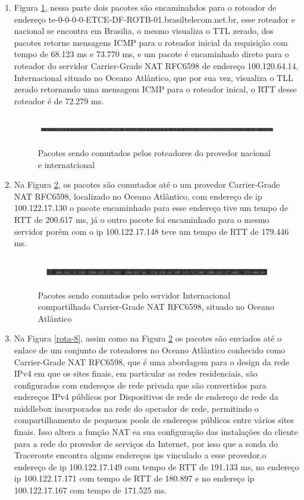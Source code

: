 \documentclass[
	article,			%
	11pt,				%
	oneside,			%
	a4paper,			%
	section=TITLE,		%
	english,			%
	brazil,				%
	sumario=tradicional
	]{abntex2}
\begin{document}
\begin{enumerate}
		\item 
		Figura \ref{rota-6}, nessa parte dois pacotes são encaminahdos para o roteador de endereço te-0-0-0-0-ETCE-DF-ROTB-01.brasiltelecom.net.br, esse roteador e nacional se encontra em Brasilia, o mesmo visualiza o TTL zerado, dos pacotes retorne mensagens ICMP para o roteador inicial da requisição com tempo de 68.123 ms e 73.770 ms, e um pacote é encaminhado direto para o roteador do servidor Carrier-Grade NAT RFC6598 de endereço 100.120.64.14, Internacional situado no Oceano Atlântico, que por sua vez, visualiza o TLL zerado retornando uma mensagem ICMP para o roteador inical, o RTT desse roteador é de 72.279 ms.
	
	\begin{figure}[H]
		\centering
		\includegraphics[width=17cm,height=1.3cm]{./rota-6.png}
		\caption{Pacotes sendo comutados pelos roteadores do provedor nacional e internatcional}
		\label{rota-6}
	\end{figure}

		\item Na Figura \ref{rota-7}, os pacotes são comutados até o um provedor Carrier-Grade NAT RFC6598, localizado no Oceano Atlântico, com endereço de ip 100.122.17.130 o pacote encaminhado para esse endereço tive um tempo de RTT de 200.617 ms, já o outro pacote foi encaminhado para o mesmo servidor porém com o ip  100.122.17.148 teve um tempo de RTT de 179.446 ms.  
	
	\begin{figure}[H]
		\centering
		\includegraphics[width=17cm,height=1.3cm]{./rota-7.png}
		\caption{Pacotes sendo comutados pelo servidor Internacional compartilhado Carrier-Grade NAT RFC6598, situado no Oceano Atlântico}
		\label{rota-7}
	\end{figure}
	 	
	 	\item Na Figura \ref{rota-8}, assim como na Figura \ref{rota-7} os pacotes são enviados até o enlace de um conjunto de roteadores no Oceano Atlântico conhecido como Carrier-Grade NAT RFC6598, que é uma abordagem para o design da rede IPv4 em que os sites finais, em particular as redes residenciais, são configurados com endereços de rede privada que são convertidos para endereços IPv4 públicos por Dispositivos de rede de endereço de rede da middlebox incorporados na rede do operador de rede, permitindo o compartilhamento de pequenos pools de endereços públicos entre vários sites finais. Isso altera a função NAT ea sua configuração das instalações do cliente para a rede do provedor de serviços da Internet, por isso que a sonda do Traceroute encontra alguns endereços ips vinculado a esse provedor,o endereço de ip 100.122.17.149 com tempo de RTT de 191.133 ms, no endereço ip 100.122.17.171 com tempo de RTT de 180.897 e no endereço ip 100.122.17.167 com tempo de 171.525 ms.\cite{kuarsingh2014carrier}
	 	

\end{enumerate}
\end{document}
